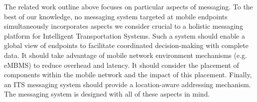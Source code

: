 The related work outline above focuses on particular aspects of
messaging.  To the best of our knowledge, no messaging system targeted
at mobile endpoints simultaneously incorporates aspects we consider
crucial to a holistic messaging platform for Intelligent
Transportation Systems.  Such a system should enable a global view of
endpoints to facilitate coordinated decision-making with complete
data. It should take advantage of mobile network environment
mechanisms (e.g. eMBMS) to reduce overhead and latency. It should
consider the placement of components within the mobile network and the
impact of this placement.  Finally, an ITS messaging system should
provide a location-aware addressing mechanism. The \name{} messaging
system is designed with all of these aspects in mind.
